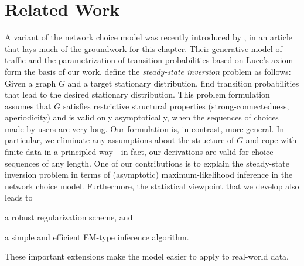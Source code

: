 \section{Related Work}  %
\label{cr:sec:relwork}

A variant of the network choice model was recently introduced by \citet{kumar2015inverting}, in an article that lays much of the groundwork for this chapter.
Their generative model of traffic and the parametrization of transition probabilities based on Luce's axiom form the basis of our work.
\citeauthor{kumar2015inverting} define the \emph{steady-state inversion} problem as follows:
Given a graph $G$ and a target stationary distribution, find transition probabilities that lead to the desired stationary distribution.
This problem formulation assumes that $G$ satisfies restrictive structural properties (strong-connectedness, aperiodicity) and is valid only asymptotically, when the sequences of choices made by users are very long.
Our formulation is, in contrast, more general.
In particular, we eliminate any assumptions about the structure of $G$ and cope with finite data in a principled way---in fact, our derivations are valid for choice sequences of any length.
One of our contributions is to explain the steady-state inversion problem in terms of (asymptotic) maximum-likelihood inference in the network choice model.
Furthermore, the statistical viewpoint that we develop also leads to
\begin{enuminline}
\item a robust regularization scheme, and
\item a simple and efficient EM-type inference algorithm.
\end{enuminline}
These important extensions make the model easier to apply to real-world data.

